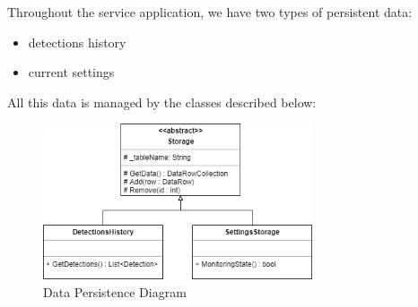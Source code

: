     Throughout the service application, we have two types of persistent data:
    \begin{itemize}
        \item detections history
        \item current settings
    \end{itemize}

    All this data is managed by the classes described below:

    \begin{figure}[H]
        \centering
        \includegraphics[width=300px, keepaspectratio]{img/storage_diagram.png}
        \caption{Data Persistence Diagram}
        \label{fig:storage_diagram}
    \end{figure}

    


        